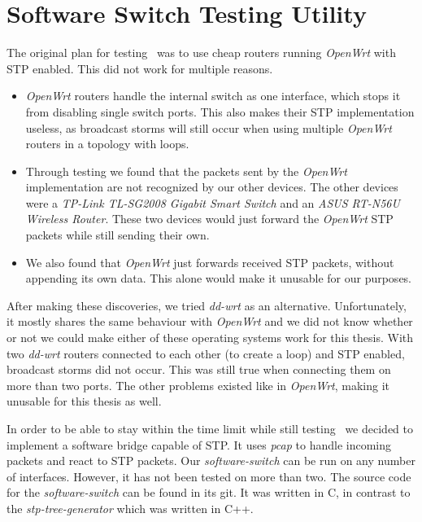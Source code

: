 \chapter{Software Switch Testing Utility}
\label{switch}
The original plan for testing \tool\ was to use cheap routers running \textit{OpenWrt}\cite{OpenWrt} with STP enabled.
This did not work for multiple reasons.
\begin{itemize}
    \item \textit{OpenWrt} routers handle the internal switch as one interface, which stops it from disabling single switch ports.
        This also makes their STP implementation useless, as broadcast storms will still occur when using multiple \textit{OpenWrt} routers in a topology with loops.
    \item Through testing we found that the packets sent by the \textit{OpenWrt} implementation are not recognized by our other devices.
    The other devices were a \textit{TP-Link TL-SG2008 Gigabit Smart Switch} and an \textit{ASUS RT-N56U Wireless Router}.
    These two devices would just forward the \textit{OpenWrt} STP packets while still sending their own.
    \item We also found that \textit{OpenWrt} just forwards received STP packets, without appending its own data.
    This alone would make it unusable for our purposes.
\end{itemize}

After making these discoveries, we tried \textit{dd-wrt}\cite{dd-wrt} as an alternative.
Unfortunately, it mostly shares the same behaviour with \textit{OpenWrt} and we did not know whether or not we could make either of these operating systems work for this thesis.
With two \textit{dd-wrt} routers connected to each other (to create a loop) and STP enabled, broadcast storms did not occur.
This was still true when connecting them on more than two ports.
The other problems existed like in \textit{OpenWrt}, making it unusable for this thesis as well.

In order to be able to stay within the time limit while still testing \tool\, we decided to implement a software bridge capable of STP.
It uses \textit{pcap} to handle incoming packets and react to STP packets.
Our \textit{software-switch} can be run on any number of interfaces.
However, it has not been tested on more than two.
The source code for the \textit{software-switch} can be found in its git\cite{soft-switch}.
It was written in C, in contrast to the \textit{stp-tree-generator} which was written in C++.

